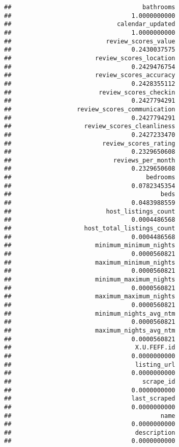 \documentclass[
]{article}
\begin{document}
\begin{verbatim}
##                                    bathrooms 
##                                 1.0000000000 
##                             calendar_updated 
##                                 1.0000000000 
##                          review_scores_value 
##                                 0.2430037575 
##                       review_scores_location 
##                                 0.2429476754 
##                       review_scores_accuracy 
##                                 0.2428355112 
##                        review_scores_checkin 
##                                 0.2427794291 
##                  review_scores_communication 
##                                 0.2427794291 
##                    review_scores_cleanliness 
##                                 0.2427233470 
##                         review_scores_rating 
##                                 0.2329650608 
##                            reviews_per_month 
##                                 0.2329650608 
##                                     bedrooms 
##                                 0.0782345354 
##                                         beds 
##                                 0.0483988559 
##                          host_listings_count 
##                                 0.0004486568 
##                    host_total_listings_count 
##                                 0.0004486568 
##                       minimum_minimum_nights 
##                                 0.0000560821 
##                       maximum_minimum_nights 
##                                 0.0000560821 
##                       minimum_maximum_nights 
##                                 0.0000560821 
##                       maximum_maximum_nights 
##                                 0.0000560821 
##                       minimum_nights_avg_ntm 
##                                 0.0000560821 
##                       maximum_nights_avg_ntm 
##                                 0.0000560821 
##                                  X.U.FEFF.id 
##                                 0.0000000000 
##                                  listing_url 
##                                 0.0000000000 
##                                    scrape_id 
##                                 0.0000000000 
##                                 last_scraped 
##                                 0.0000000000 
##                                         name 
##                                 0.0000000000 
##                                  description 
##                                 0.0000000000 

\end{verbatim}
\end{document}

